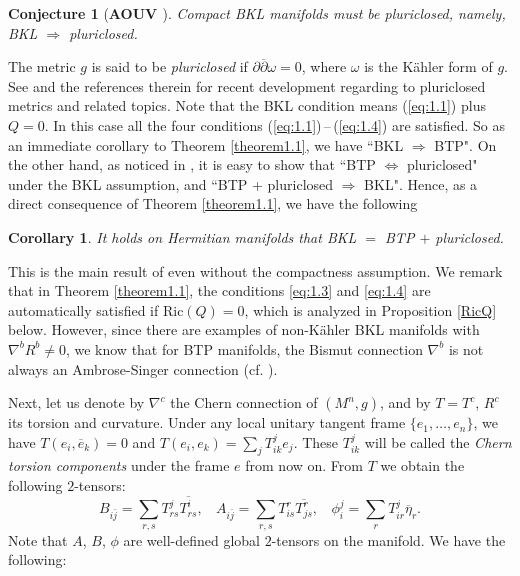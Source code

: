 \documentclass{amsart}
\numberwithin{equation}{section}
\newtheorem{corollary}  [theorem]     {Corollary}
\newtheorem{conjecture}  [theorem]     {Conjecture}
\theoremstyle{definition}
\renewcommand{\1}{\mathds{1}}
\renewcommand{\>}{\rightarrow}
\begin{document}
\begin{conjecture}[{\bf AOUV \cite{AOUV}}] \label{conj1.3}
Compact BKL manifolds must be pluriclosed, namely, BKL $\Longrightarrow$ pluriclosed.
\end{conjecture}

The metric $g$ is said to be {\em pluriclosed} if $\partial \overline{\partial} \omega =0$, where $\omega$ is the K\"ahler form of $g$. See \cite{BFG,BPT,FG,Ye,IS,Yang} and the references therein for recent development regarding to pluriclosed metrics and related topics. Note that the BKL condition means (\ref{eq:1.1}) plus $Q=0$. In this case all the four conditions (\ref{eq:1.1})\,--\,(\ref{eq:1.4}) are satisfied. So as an immediate corollary to Theorem \ref{theorem1.1}, we have ``BKL $\Longrightarrow$ BTP". On the other hand, as noticed in  \cite{ZhaoZ19Str}, it is easy to show that ``BTP $\Longleftrightarrow $ pluriclosed" under the BKL assumption, and ``BTP + pluriclosed $\Longrightarrow $ BKL". Hence, as a direct consequence of Theorem \ref{theorem1.1}, we have the following

\begin{corollary} \label{cor1.4}
It holds on Hermitian manifolds that BKL $=$ BTP $+$ pluriclosed.
\end{corollary}

This is the main result of \cite{ZhaoZ19Str} even without the compactness assumption.
We remark that in Theorem \ref{theorem1.1}, the conditions \eqref{eq:1.3} and \eqref{eq:1.4}
are automatically satisfied if $\mathrm{Ric}(Q)=0$, which is analyzed in Proposition \ref{RicQ} below.
However, since there are examples of non-K\"ahler BKL manifolds with $\nabla^b R^b\neq 0$,
we know that for BTP manifolds, the Bismut connection $\nabla^b$ is not always an Ambrose-Singer
connection (cf. \cite{AS,NZ1,NZ2,BP}).



Next, let us denote by $\nabla^c$ the Chern connection of $(M^n,g)$, and by $T=T^c$, $R^c$ its torsion and curvature. Under any local unitary tangent frame $\{ e_1, \ldots , e_n\}$, we have $T(e_i,\overline{e}_k)=0$ and $T(e_i,e_k)=\sum_j T^j_{ik} e_j$. These $T^j_{ik}$ will be called the {\em Chern torsion components} under the frame $e$ from now on. From $T$ we obtain the following $2$-tensors:
$$ B_{i\bar{j}}=\sum_{r,s} T^j_{rs} \overline{ T^i_{rs} } , \ \ \ \ A_{i\bar{j}} =\sum_{r,s} T^r_{is} \overline{T^r_{js}}, \ \ \ \ \phi^j_i = \sum_r T^j_{ir} \overline{\eta}_r. $$
Note that $A$, $B$, $\phi$ are well-defined global $2$-tensors on the manifold.  We have the following:
\end{document}
